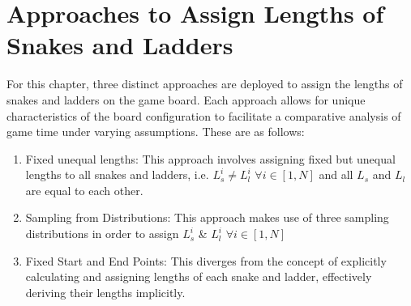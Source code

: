 \documentclass[12pt]{report}
\begin{document}
	\section{Approaches to Assign Lengths of Snakes and Ladders}
	For this chapter, three distinct approaches are deployed to assign the lengths of snakes and ladders on the game board. Each approach allows for unique characteristics of the board configuration to facilitate a comparative analysis of game time under varying assumptions. These are as follows:
	\begin{enumerate}
		\item Fixed unequal lengths: This approach involves assigning fixed but unequal lengths to all snakes and ladders, i.e. $L^i_s \neq  L^i_l$ \space $ \forall i \in [1, N]$ and all $L_s$  and $L_l$ are equal to each other.\linebreak
		\item Sampling from Distributions: This approach makes use of three sampling distributions in order to assign $L^i_s$ \&  $L^i_l$ \space $\forall i \in [1, N]$
		\item Fixed Start and End Points: This diverges from the concept of explicitly calculating and assigning lengths of each snake and ladder, effectively deriving their lengths implicitly.
	\end{enumerate}
	
	
\end{document}
